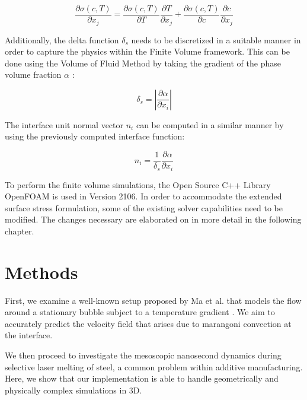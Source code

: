 \documentclass[conference,final]{IEEEtran}
\begin{document}
\begin{equation}
    \frac{\partial \sigma(c,T)}{\partial x_j} = \frac{\partial \sigma(c,T)}{\partial T} \frac{\partial T}{\partial x_j} + \frac{\partial \sigma(c,T)}{\partial c} \frac{\partial c}{\partial x_j}
    \label{eq:sigmadiff}
\end{equation}

Additionally, the delta function $\delta_s$ needs to be discretized in a suitable manner in order to capture the physics within the Finite Volume framework. This can be done using the Volume of Fluid Method by taking the gradient of the phase volume fraction $\alpha$ \cite{gueyffierVolumeofFluidInterfaceTracking1999,hirtVolumeFluidVOF1981}:

\begin{equation}
    \delta_s = \left\lvert \frac{\partial \alpha}{\partial x_i} \right\rvert
\end{equation}

The interface unit normal vector $n_i$ can be computed in a similar manner by using the previously computed interface function:

\begin{equation}
    n_i = \frac{1}{\delta_s} \frac{\partial \alpha}{\partial x_i}
\end{equation}

To perform the finite volume simulations, the Open Source C++ Library OpenFOAM is used in Version 2106. In order to accommodate the extended surface stress formulation, some of the existing solver capabilities need to be modified. The changes necessary are elaborated on in more detail in the following chapter.

\section{Methods}

First, we examine a well-known setup proposed by Ma et al. that models the flow around a stationary bubble subject to a temperature gradient \cite{maDirectNumericalSimulation2011}. We aim to accurately predict the velocity field that arises due to marangoni convection at the interface.

We then proceed to investigate the mesoscopic nanosecond dynamics during selective laser melting of steel, a common problem within additive manufacturing. Here, we show that our implementation is able to handle geometrically and physically complex simulations in 3D.
\end{document}
